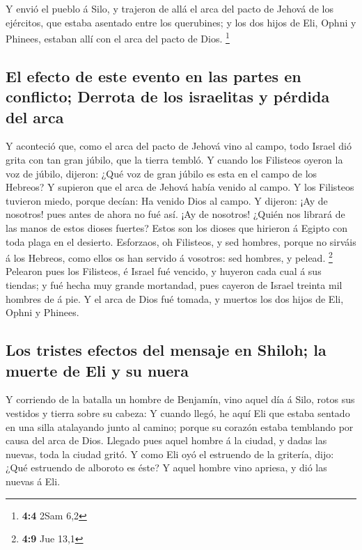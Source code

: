 Y envió el pueblo á Silo, y trajeron de allá el arca del
pacto de Jehová de los ejércitos, que estaba asentado entre los
querubines; y los dos hijos de Eli, Ophni y Phinees, estaban allí con el
arca del pacto de Dios. \footnote{\textbf{4:4} 2Sam 6,2}

\hypertarget{el-efecto-de-este-evento-en-las-partes-en-conflicto-derrota-de-los-israelitas-y-puxe9rdida-del-arca}{%
\subsection{El efecto de este evento en las partes en conflicto; Derrota
de los israelitas y pérdida del
arca}\label{el-efecto-de-este-evento-en-las-partes-en-conflicto-derrota-de-los-israelitas-y-puxe9rdida-del-arca}}

 Y aconteció que, como el arca del pacto de Jehová vino al
campo, todo Israel dió grita con tan gran júbilo, que la tierra tembló.
 Y cuando los Filisteos oyeron la voz de júbilo, dijeron:
¿Qué voz de gran júbilo es esta en el campo de los Hebreos? Y supieron
que el arca de Jehová había venido al campo.  Y los
Filisteos tuvieron miedo, porque decían: Ha venido Dios al campo. Y
dijeron: ¡Ay de nosotros! pues antes de ahora no fué así. 
¡Ay de nosotros! ¿Quién nos librará de las manos de estos dioses
fuertes? Estos son los dioses que hirieron á Egipto con toda plaga en el
desierto.  Esforzaos, oh Filisteos, y sed hombres, porque no
sirváis á los Hebreos, como ellos os han servido á vosotros: sed
hombres, y pelead. \footnote{\textbf{4:9} Jue 13,1} 
Pelearon pues los Filisteos, é Israel fué vencido, y huyeron cada cual á
sus tiendas; y fué hecha muy grande mortandad, pues cayeron de Israel
treinta mil hombres de á pie.  Y el arca de Dios fué
tomada, y muertos los dos hijos de Eli, Ophni y Phinees.

\hypertarget{los-tristes-efectos-del-mensaje-en-shiloh-la-muerte-de-eli-y-su-nuera}{%
\subsection{Los tristes efectos del mensaje en Shiloh; la muerte de Eli
y su
nuera}\label{los-tristes-efectos-del-mensaje-en-shiloh-la-muerte-de-eli-y-su-nuera}}

 Y corriendo de la batalla un hombre de Benjamín, vino
aquel día á Silo, rotos sus vestidos y tierra sobre su cabeza:
 Y cuando llegó, he aquí Eli que estaba sentado en una
silla atalayando junto al camino; porque su corazón estaba temblando por
causa del arca de Dios. Llegado pues aquel hombre á la ciudad, y dadas
las nuevas, toda la ciudad gritó.  Y como Eli oyó el
estruendo de la gritería, dijo: ¿Qué estruendo de alboroto es éste? Y
aquel hombre vino apriesa, y dió las nuevas á Eli.

